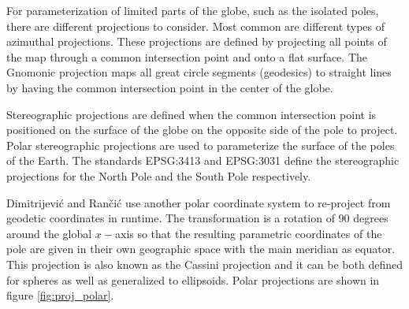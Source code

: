 For parameterization of limited parts of the globe, such as the isolated poles, there are different projections to consider. Most common are different types of azimuthal projections. These projections are defined by projecting all points of the map through a common intersection point and onto a flat surface. The Gnomonic projection maps all great circle segments (geodesics) to straight lines by having the common intersection point in the center of the globe.

Stereographic projections are defined when the common intersection point is positioned on the surface of the globe on the opposite side of the pole to project. Polar stereographic projections are used to parameterize the surface of the poles of the Earth. The standards EPSG:3413 and EPSG:3031 define the stereographic projections for the North Pole and the South Pole respectively.

Dimitrijevi\'{c} and Ran\v{c}i\'{c} use another polar coordinate system to re-project from geodetic coordinates in runtime. The transformation is a rotation of 90 degrees around the global $x-$axis so that the resulting parametric coordinates of the pole are given in their own geographic space with the main meridian as equator. This projection is also known as the Cassini projection and it can be both defined for spheres as well as generalized to ellipsoids. Polar projections are shown in figure \ref{fig:proj_polar}.

